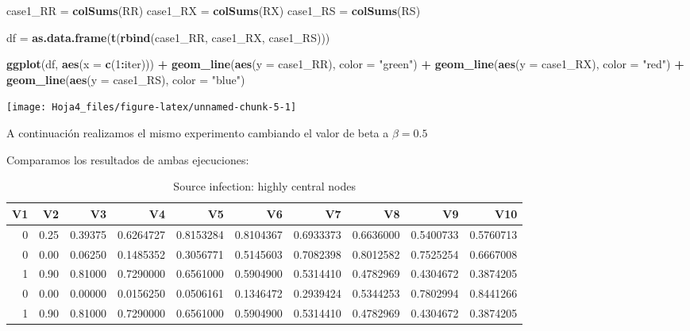\documentclass[
]{article}
\newenvironment{Shaded}{\begin{snugshade}}{\end{snugshade}}
\newcommand{\DataTypeTok}[1]{\textcolor[rgb]{0.13,0.29,0.53}{#1}}
\newcommand{\DecValTok}[1]{\textcolor[rgb]{0.00,0.00,0.81}{#1}}
\newcommand{\KeywordTok}[1]{\textcolor[rgb]{0.13,0.29,0.53}{\textbf{#1}}}
\newcommand{\NormalTok}[1]{#1}
\newcommand{\OperatorTok}[1]{\textcolor[rgb]{0.81,0.36,0.00}{\textbf{#1}}}
\newcommand{\StringTok}[1]{\textcolor[rgb]{0.31,0.60,0.02}{#1}}
\begin{document}
\begin{Shaded}
\begin{Highlighting}[]
\NormalTok{case1\_RR =}\StringTok{ }\KeywordTok{colSums}\NormalTok{(RR)}
\NormalTok{case1\_RX =}\StringTok{ }\KeywordTok{colSums}\NormalTok{(RX)}
\NormalTok{case1\_RS =}\StringTok{ }\KeywordTok{colSums}\NormalTok{(RS)}

\NormalTok{df =}\StringTok{ }\KeywordTok{as.data.frame}\NormalTok{(}\KeywordTok{t}\NormalTok{(}\KeywordTok{rbind}\NormalTok{(case1\_RR, case1\_RX, case1\_RS)))}

\KeywordTok{ggplot}\NormalTok{(df, }\KeywordTok{aes}\NormalTok{(}\DataTypeTok{x =} \KeywordTok{c}\NormalTok{(}\DecValTok{1}\OperatorTok{:}\NormalTok{iter))) }\OperatorTok{+}
\StringTok{  }\KeywordTok{geom\_line}\NormalTok{(}\KeywordTok{aes}\NormalTok{(}\DataTypeTok{y =}\NormalTok{ case1\_RR), }\DataTypeTok{color =} \StringTok{"green"}\NormalTok{) }\OperatorTok{+}
\StringTok{  }\KeywordTok{geom\_line}\NormalTok{(}\KeywordTok{aes}\NormalTok{(}\DataTypeTok{y =}\NormalTok{ case1\_RX), }\DataTypeTok{color =} \StringTok{"red"}\NormalTok{) }\OperatorTok{+}
\StringTok{  }\KeywordTok{geom\_line}\NormalTok{(}\KeywordTok{aes}\NormalTok{(}\DataTypeTok{y =}\NormalTok{ case1\_RS), }\DataTypeTok{color =} \StringTok{"blue"}\NormalTok{)}
\end{Highlighting}
\end{Shaded}

\begin{center}\texttt{[image: Hoja4\_files/figure-latex/unnamed-chunk-5-1]} \end{center}

A continuación realizamos el mismo experimento cambiando el valor de
beta a \(\beta = 0.5\)

Comparamos los resultados de ambas ejecuciones:

\begin{table}[!h]

\caption{\label{tab:unnamed-chunk-8}Source infection: highly central nodes}
\centering
\fontsize{7}{9}\selectfont
\begin{tabular}[t]{rrrrrrrrrr}
\toprule
V1 & V2 & V3 & V4 & V5 & V6 & V7 & V8 & V9 & V10\\
\midrule
0 & 0.25 & 0.39375 & 0.6264727 & 0.8153284 & 0.8104367 & 0.6933373 & 0.6636000 & 0.5400733 & 0.5760713\\
0 & 0.00 & 0.06250 & 0.1485352 & 0.3056771 & 0.5145603 & 0.7082398 & 0.8012582 & 0.7525254 & 0.6667008\\
1 & 0.90 & 0.81000 & 0.7290000 & 0.6561000 & 0.5904900 & 0.5314410 & 0.4782969 & 0.4304672 & 0.3874205\\
0 & 0.00 & 0.00000 & 0.0156250 & 0.0506161 & 0.1346472 & 0.2939424 & 0.5344253 & 0.7802994 & 0.8441266\\
1 & 0.90 & 0.81000 & 0.7290000 & 0.6561000 & 0.5904900 & 0.5314410 & 0.4782969 & 0.4304672 & 0.3874205\\
\bottomrule
\end{tabular}
\end{table}
\end{document}
